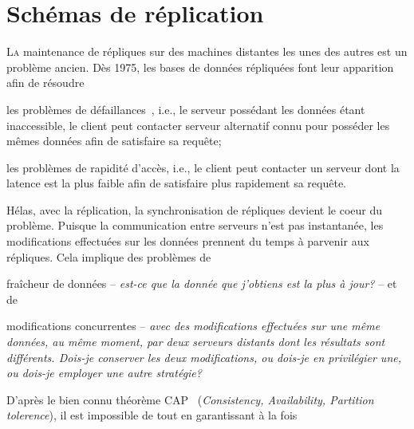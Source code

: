 
\chapter{Schémas de réplication}
\label{repl:chap:replication}

\minitoc

\lettrine{L}a maintenance de répliques sur des machines distantes les unes des
autres est un problème ancien. Dès 1975, les bases de données répliquées font
leur apparition~\cite{johnson1975maintenance} afin de résoudre
\begin{inparaenum}[(i)]
\item les problèmes de défaillances~\cite{alsberg1976principle}, i.e., le
  serveur possédant les données étant inaccessible, le client peut contacter
  serveur alternatif connu pour posséder les mêmes données afin de satisfaire sa
  requête;
\item les problèmes de rapidité d'accès, i.e., le client peut contacter un
  serveur dont la latence est la plus faible afin de satisfaire plus rapidement
  sa requête.
\end{inparaenum}

Hélas, avec la réplication, la synchronisation de répliques devient le coeur du
problème. Puisque la communication entre serveurs n'est pas instantanée, les
modifications effectuées sur les données prennent du temps à parvenir aux
répliques. Cela implique des problèmes de
\begin{inparaenum}[(i)]
\item fraîcheur de données -- \emph{est-ce que la donnée que j'obtiens est la
    plus à jour?} -- et de
\item modifications concurrentes -- \emph{avec des modifications effectuées sur
    une même données, au même moment, par deux serveurs distants dont les
    résultats sont différents. Dois-je conserver les deux modifications, ou
    dois-je en privilégier une, ou dois-je employer une autre stratégie?}
\end{inparaenum}

D'après le bien connu théorème CAP~\cite{gilbert2002brewer} (\emph{Consistency,
  Availability, Partition tolerence}), il est impossible de  tout en garantissant à la fois 

